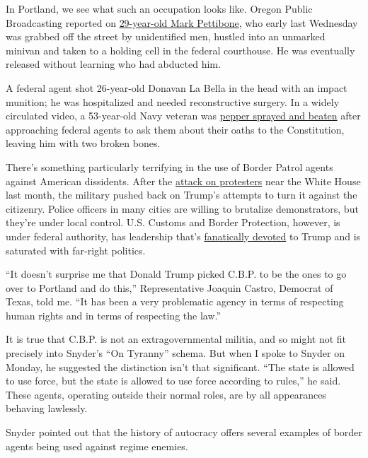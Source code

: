 In Portland, we see what such an occupation looks like. Oregon Public
Broadcasting reported on
\href{https://www.opb.org/news/article/federal-law-enforcement-unmarked-vehicles-portland-protesters/}{29-year-old
Mark Pettibone}, who early last Wednesday was grabbed off the street by
unidentified men, hustled into an unmarked minivan and taken to a
holding cell in the federal courthouse. He was eventually released
without learning who had abducted him.

A federal agent shot 26-year-old Donavan La Bella in the head with an
impact munition; he was hospitalized and needed reconstructive surgery.
In a widely circulated video, a 53-year-old Navy veteran was
\href{https://www.washingtonpost.com/nation/2020/07/20/christopher-david-portland-protest-video/}{pepper
sprayed and beaten} after approaching federal agents to ask them about
their oaths to the Constitution, leaving him with two broken bones.

There's something particularly terrifying in the use of Border Patrol
agents against American dissidents. After the
\href{https://www.nytimes3xbfgragh.onion/2020/06/02/us/politics/trump-walk-lafayette-square.html}{attack
on protesters} near the White House last month, the military pushed back
on Trump's attempts to turn it against the citizenry. Police officers in
many cities are willing to brutalize demonstrators, but they're under
local control. U.S. Customs and Border Protection, however, is under
federal authority, has leadership that's
\href{https://www.newyorker.com/news/news-desk/the-border-patrol-was-primed-for-president-trump}{fanatically
devoted} to Trump and is saturated with far-right politics.

``It doesn't surprise me that Donald Trump picked C.B.P. to be the ones
to go over to Portland and do this,'' Representative Joaquin Castro,
Democrat of Texas, told me. ``It has been a very problematic agency in
terms of respecting human rights and in terms of respecting the law.''

It is true that C.B.P. is not an extragovernmental militia, and so might
not fit precisely into Snyder's ``On Tyranny'' schema. But when I spoke
to Snyder on Monday, he suggested the distinction isn't that
significant. ``The state is allowed to use force, but the state is
allowed to use force according to rules,'' he said. These agents,
operating outside their normal roles, are by all appearances behaving
lawlessly.

Snyder pointed out that the history of autocracy offers several examples
of border agents being used against regime enemies.

